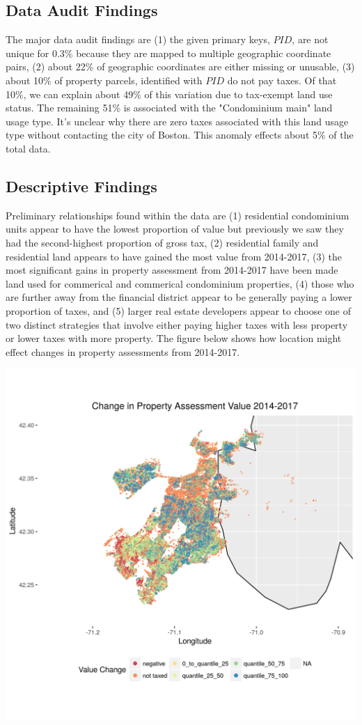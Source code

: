 \documentclass[12pt]{article}
\begin{document}
\subsection{Data Audit Findings}

The major data audit findings are (1) the given primary keys, $PID$, are 
not unique for 0.3\% because they are mapped to multiple geographic 
coordinate pairs, (2) about 22\% of geographic coordinates are either 
missing or unusable, (3) about 10\% of property parcels, identified with
$PID$ do not pay taxes. Of that 10\%, we can explain about 49\% of this 
variation due to tax-exempt land use status. The remaining 51\% is 
associated with the "Condominium main" land usage type. It's unclear why 
there are zero taxes associated with this land usage type without 
contacting the city of Boston. This anomaly effects about 5\% of the 
total data.

\subsection{Descriptive Findings}
Preliminary relationships found within the data are (1) residential 
condominium units appear to have the lowest proportion of value but 
previously we saw they had the second-highest proportion of gross tax,
(2) residential family and residential land appears to have gained the 
most value from 2014-2017, (3) the most significant gains in property
assessment from 2014-2017 have been made land used for commerical and
commerical condominium properties, (4) those who are further away from 
the financial district appear to be generally paying a lower proportion 
of taxes, and (5) larger real estate developers appear to choose one
of two distinct strategies that involve either paying higher taxes with
less property or lower taxes with more property. The figure below shows
how location might effect changes in property assessments from 2014-2017.

\includegraphics[scale=0.75]{property_delta2014-2017}


 

\end{document}
